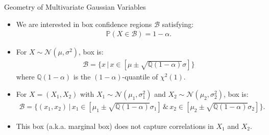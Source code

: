 \documentclass[9pt]{beamer}
\begin{document}
%
\begin{frame}{Geometry of Multivariate Gaussian Variables}

\begin{itemize}
\setlength{\itemsep}{10pt}
\item We are interested in box confidence regions $\mathcal{B}$ satisfying:
\begin{align*}
\mathbb{P}(X\in \mathcal{B})=1-\alpha.
\end{align*}
\item For $X\sim \mathcal{N}(\mu,\sigma^2)$, box is:
\begin{align*}
\mathcal{B}=\{x\,|\,x\in [\mu\pm \sqrt{\mathbb{Q}(1-\alpha)} \sigma]\} 
\end{align*}
where $\mathbb{Q}(1-\alpha)$ is the $(1-\alpha)$-quantile of $\chi^2(1)$. 
\item For $X=(X_1,X_2)$ with $X_1\sim \mathcal{N}(\mu_1,\sigma_1^2)$ and $X_2\sim \mathcal{N}(\mu_2,\sigma_2^2)$, box is:
\begin{align*}
\mathcal{B}=\{(x_1,x_2)\,|\,x_1\in [\mu_1\pm \sqrt{\mathbb{Q}(1-\alpha)}\sigma_1]\,\&\,x_2\in [\mu_2\pm \sqrt{\mathbb{Q}(1-\alpha)}\sigma_2]\}.
\end{align*}
\item This box (a.k.a. marginal box) does not capture correlations in $X_1$ and $X_2$. 
\end{itemize}

\end{frame}
\end{document}
